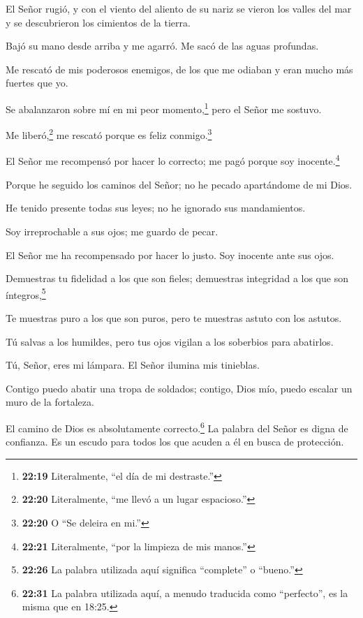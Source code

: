  El Señor rugió, y con el viento del aliento de su nariz se
vieron los valles del mar y se descubrieron los cimientos de la tierra.

 Bajó su mano desde arriba y me agarró. Me sacó de las
aguas profundas.

 Me rescató de mis poderosos enemigos, de los que me
odiaban y eran mucho más fuertes que yo.

 Se abalanzaron sobre mí en mi peor momento,\footnote{\textbf{22:19}
  Literalmente, ``el día de mi destraste.''} pero el Señor me sostuvo.

 Me liberó,\footnote{\textbf{22:20} Literalmente, ``me
  llevó a un lugar espacioso.''} me rescató porque es feliz
conmigo.\footnote{\textbf{22:20} O ``Se deleira en mi.''}

 El Señor me recompensó por hacer lo correcto; me pagó
porque soy inocente.\footnote{\textbf{22:21} Literalmente, ``por la
  limpieza de mis manos.''}

 Porque he seguido los caminos del Señor; no he pecado
apartándome de mi Dios.

 He tenido presente todas sus leyes; no he ignorado sus
mandamientos.

 Soy irreprochable a sus ojos; me guardo de pecar.

 El Señor me ha recompensado por hacer lo justo. Soy
inocente ante sus ojos.

 Demuestras tu fidelidad a los que son fieles; demuestras
integridad a los que son íntegros,\footnote{\textbf{22:26} La palabra
  utilizada aquí significa ``complete'' o ``bueno.''}

 Te muestras puro a los que son puros, pero te muestras
astuto con los astutos.

 Tú salvas a los humildes, pero tus ojos vigilan a los
soberbios para abatirlos.

 Tú, Señor, eres mi lámpara. El Señor ilumina mis
tinieblas.

 Contigo puedo abatir una tropa de soldados; contigo, Dios
mío, puedo escalar un muro de la fortaleza.

 El camino de Dios es absolutamente correcto.\footnote{\textbf{22:31}
  La palabra utilizada aquí, a menudo traducida como ``perfecto'', es la
  misma que en 18:25.} La palabra del Señor es digna de confianza. Es un
escudo para todos los que acuden a él en busca de protección.

